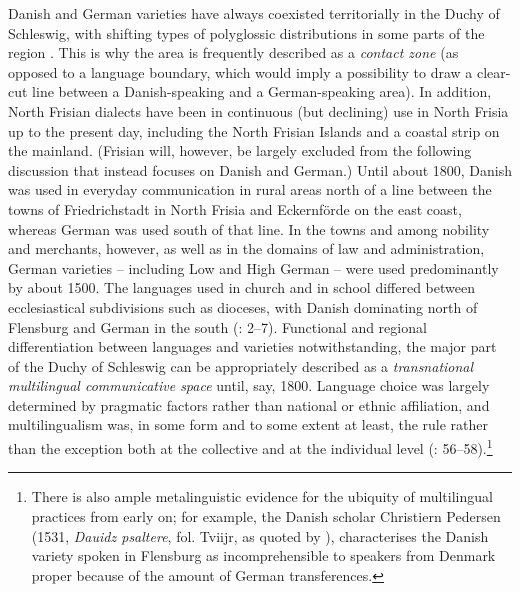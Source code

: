 \documentclass[output=paper]{langsci/langscibook}
\begin{document}
Danish and German varieties have always coexisted territorially in the Duchy of Schleswig, with shifting types of polyglossic distributions in some parts of the region \citep{Winge.2004}. This is why the area is frequently described as a \textit{contact zone} (as opposed to a language boundary, which would imply a possibility to draw a clear-cut line between a Danish-speaking and a German-speaking area). In addition, North Frisian dialects have been in continuous (but declining) use in North Frisia up to the present day, including the North Frisian Islands and a coastal strip on the mainland. (Frisian will, however, be largely excluded from the following discussion that instead focuses on Danish and German.) Until about 1800, Danish was used in everyday communication in rural areas north of a line between the towns of Friedrichstadt in North Frisia and Eckernförde on the east coast, whereas German was used south of that line. In the towns and among nobility and merchants, however, as well as in the domains of law and administration, German varieties – including Low and High German – were used predominantly by about 1500. The languages used in church and in school differed between ecclesiastical subdivisions such as dioceses, with Danish dominating north of Flensburg and German in the south (\citealt{Fredsted.2009}: 2–7). Functional and regional differentiation between languages and varieties notwithstanding, the major part of the Duchy of Schleswig can be appropriately described as a \textit{transnational multilingual communicative space} until, say, 1800. Language choice was largely determined by pragmatic factors rather than national or ethnic affiliation, and multilingualism was, in some form and to some extent at least, the rule rather than the exception both at the collective and at the individual level (\citealt{Hoder.2019}: 56–58).\footnote{There is also ample metalinguistic evidence for the ubiquity of multilingual practices from early on; for example, the Danish scholar Christiern Pedersen (1531, \textit{Dauidz psaltere}, fol. Tviijr, as quoted by \citealt[162]{Skautrup.1947}), characterises the Danish variety spoken in Flensburg as incomprehensible to speakers from Denmark proper because of the amount of German transferences.}
\end{document}
